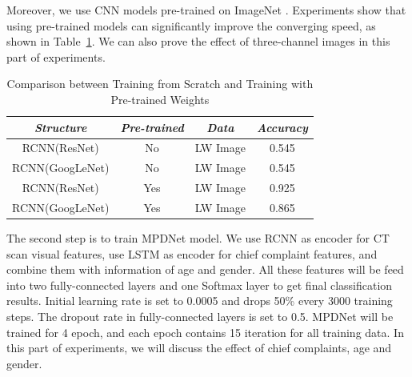 \documentclass[journal]{IEEEtran}
\begin{document}
Moreover, we use CNN models pre-trained on ImageNet \cite{ILSVRC15}. Experiments show that using pre-trained models can significantly improve the converging speed, as shown in Table~\ref{pretrain}. We can also prove the effect of three-channel images in this part of experiments.
\begin{table}[htb]
    \vspace{-0cm}
    \caption{Comparison between Training from Scratch and Training with Pre-trained Weights}
    \vspace{-0cm}
    \begin{center}
    \begin{tabular}{|c|c|c|c|}
    \hline
    \textbf{\textit{Structure}} & \textbf{\textit{Pre-trained}} & \textbf{\textit{Data}}& \textbf{\textit{Accuracy}}  \\
    \hline
    RCNN(ResNet) &No & LW Image & 0.545\\
    RCNN(GoogLeNet) & No & LW Image & 0.545\\
    RCNN(ResNet) & Yes & LW Image & 0.925\\
    RCNN(GoogLeNet) & Yes & LW Image & 0.865\\
    
    \hline
    \end{tabular}
    \vspace{-0cm}
    \label{pretrain}
    \end{center}
    \vspace{-0cm}
    \end{table}
    
The second step is to train MPDNet model. We use RCNN as encoder for CT scan visual features, use LSTM as encoder for chief complaint features, and combine them with information of age and gender. All these features will be feed into two fully-connected layers and one Softmax layer to get final classification results. Initial learning rate is set to 0.0005 and drops 50\% every 3000 training steps. The dropout rate in fully-connected layers is set to 0.5. MPDNet will be trained for 4 epoch, and each epoch contains 15 iteration for all training data. In this part of experiments, we will discuss the effect of chief complaints, age and gender.
\end{document}
